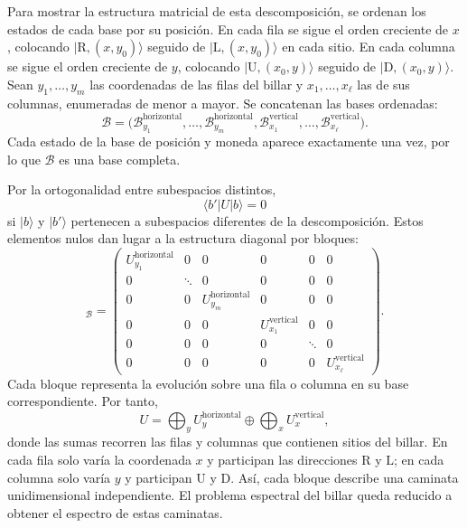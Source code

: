 \documentclass[12pt,a4paper,oneside]{report} %
\begin{document}
Para mostrar la estructura matricial de esta descomposición, se ordenan los estados de cada base por su posición. En cada fila se sigue el orden creciente de $x$, colocando $|\mathrm{R},(x,y_0)\rangle$ seguido de $|\mathrm{L},(x,y_0)\rangle$ en cada sitio. En cada columna se sigue el orden creciente de $y$, colocando $|\mathrm{U},(x_0,y)\rangle$ seguido de $|\mathrm{D},(x_0,y)\rangle$. Sean $y_1,\ldots,y_m$ las coordenadas de las filas del billar y $x_1,\ldots,x_\ell$ las de sus columnas, enumeradas de menor a mayor. Se concatenan las bases ordenadas:
\begin{equation}
  \mathcal B=
  \bigl(
    \mathcal B_{y_1}^{\text{horizontal}},
    \ldots,
    \mathcal B_{y_m}^{\text{horizontal}},
    \mathcal B_{x_1}^{\text{vertical}},
    \ldots,
    \mathcal B_{x_\ell}^{\text{vertical}}
  \bigr).
\end{equation}
Cada estado de la base de posición y moneda aparece exactamente una vez, por lo que $\mathcal B$ es una base completa.

Por la ortogonalidad entre subespacios distintos,
\begin{equation}
  \langle b'|U|b\rangle=0
\end{equation}
si $|b\rangle$ y $|b'\rangle$ pertenecen a subespacios diferentes de la descomposición. Estos elementos nulos dan lugar a la estructura diagonal por bloques:
\begin{equation}
  [U]_{\mathcal B}
  =
  \begin{pmatrix}
    U_{y_1}^{\text{horizontal}} & 0 & 0 & 0 & 0 & 0\\
    0 & \ddots & 0 & 0 & 0 & 0\\
    0 & 0 & U_{y_m}^{\text{horizontal}} & 0 & 0 & 0\\
    0 & 0 & 0 & U_{x_1}^{\text{vertical}} & 0 & 0\\
    0 & 0 & 0 & 0 & \ddots & 0\\
    0 & 0 & 0 & 0 & 0 & U_{x_\ell}^{\text{vertical}}
  \end{pmatrix}.
\end{equation}
Cada bloque representa la evolución sobre una fila o columna en su base correspondiente. Por tanto,
\begin{equation}
  U
  =
  \bigoplus_y U_y^{\text{horizontal}}
  \oplus
  \bigoplus_x U_x^{\text{vertical}},
  \label{eq:descomposicion-en-tramos}
\end{equation}
donde las sumas recorren las filas y columnas que contienen sitios del billar. En cada fila solo varía la coordenada $x$ y participan las direcciones $\mathrm{R}$ y $\mathrm{L}$; en cada columna solo varía $y$ y participan $\mathrm{U}$ y $\mathrm{D}$. Así, cada bloque describe una caminata unidimensional independiente. El problema espectral del billar queda reducido a obtener el espectro de estas caminatas.
\end{document}
